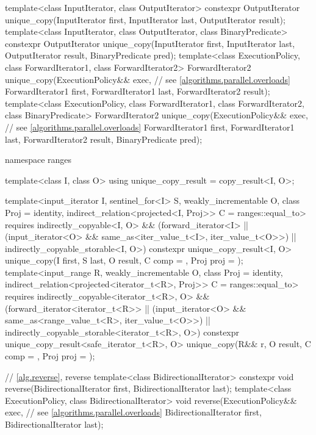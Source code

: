 \begin{codeblock}
{  template<class InputIterator, class OutputIterator>
    constexpr OutputIterator
      unique_copy(InputIterator first, InputIterator last,
                  OutputIterator result);
  template<class InputIterator, class OutputIterator, class BinaryPredicate>
    constexpr OutputIterator
      unique_copy(InputIterator first, InputIterator last,
                  OutputIterator result, BinaryPredicate pred);
  template<class ExecutionPolicy, class ForwardIterator1, class ForwardIterator2>
    ForwardIterator2
      unique_copy(ExecutionPolicy&& exec,                       // see \ref{algorithms.parallel.overloads}
                  ForwardIterator1 first, ForwardIterator1 last,
                  ForwardIterator2 result);
  template<class ExecutionPolicy, class ForwardIterator1, class ForwardIterator2,
           class BinaryPredicate>
    ForwardIterator2
      unique_copy(ExecutionPolicy&& exec,                       // see \ref{algorithms.parallel.overloads}
                  ForwardIterator1 first, ForwardIterator1 last,
                  ForwardIterator2 result, BinaryPredicate pred);

  namespace ranges {
    template<class I, class O>
    using unique_copy_result = copy_result<I, O>;

    template<input_iterator I, sentinel_for<I> S, weakly_incrementable O,
             class Proj = identity, indirect_relation<projected<I, Proj>> C = ranges::equal_to>
      requires indirectly_copyable<I, O> &&
               (forward_iterator<I> ||
                (input_iterator<O> && same_as<iter_value_t<I>, iter_value_t<O>>) ||
                indirectly_copyable_storable<I, O>)
      constexpr unique_copy_result<I, O>
        unique_copy(I first, S last, O result, C comp = {}, Proj proj = {});
    template<input_range R, weakly_incrementable O, class Proj = identity,
             indirect_relation<projected<iterator_t<R>, Proj>> C = ranges::equal_to>
      requires indirectly_copyable<iterator_t<R>, O> &&
               (forward_iterator<iterator_t<R>> ||
                (input_iterator<O> && same_as<range_value_t<R>, iter_value_t<O>>) ||
                indirectly_copyable_storable<iterator_t<R>, O>)
      constexpr unique_copy_result<safe_iterator_t<R>, O>
        unique_copy(R&& r, O result, C comp = {}, Proj proj = {});
  }

  // \ref{alg.reverse}, reverse
  template<class BidirectionalIterator>
    constexpr void reverse(BidirectionalIterator first, BidirectionalIterator last);
  template<class ExecutionPolicy, class BidirectionalIterator>
    void reverse(ExecutionPolicy&& exec,                        // see \ref{algorithms.parallel.overloads}
                 BidirectionalIterator first, BidirectionalIterator last);

}
\end{codeblock}
